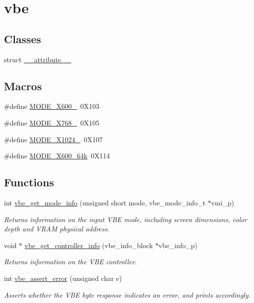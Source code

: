 \hypertarget{group__vbe}{}\section{vbe}
\label{group__vbe}
\subsection*{Classes}
\begin{DoxyCompactItemize}
\item 
struct \hyperlink{struct____attribute____}{\+\_\+\+\_\+attribute\+\_\+\+\_\+}
\end{DoxyCompactItemize}
\subsection*{Macros}
\begin{DoxyCompactItemize}
\item 
\#define \hyperlink{group__vbe_gaf81534a9db918a753a9896b07317b05a}{M\+O\+D\+E\+\_\+X600\+\_}~0\+X103
\item 
\#define \hyperlink{group__vbe_ga22528d5b4d6e5545c28def27f6074fe3}{M\+O\+D\+E\+\_\+X768\+\_}~0\+X105
\item 
\#define \hyperlink{group__vbe_gafe1e2b1f8808d2531aabf6b94b9947ca}{M\+O\+D\+E\+\_\+X1024\+\_}~0\+X107
\item 
\#define \hyperlink{group__vbe_gad5df9a29ede26cb662f094f3315de162}{M\+O\+D\+E\+\_\+X600\+\_\+64k}~0\+X114
\end{DoxyCompactItemize}
\subsection*{Functions}
\begin{DoxyCompactItemize}
\item 
int \hyperlink{group__vbe_ga4ef3234e41f2050bc094a22049b69e45}{vbe\+\_\+get\+\_\+mode\+\_\+info} (unsigned short mode, vbe\+\_\+mode\+\_\+info\+\_\+t $\ast$vmi\+\_\+p)
\begin{DoxyCompactList}\small\item\em Returns information on the input V\+BE mode, including screen dimensions, color depth and V\+R\+AM physical address. \end{DoxyCompactList}\item 
void $\ast$ \hyperlink{group__vbe_ga802bfdaa0b951c9fc68eff68d1b27436}{vbe\+\_\+get\+\_\+controller\+\_\+info} (vbe\+\_\+info\+\_\+block $\ast$vbe\+\_\+info\+\_\+p)
\begin{DoxyCompactList}\small\item\em Returns information on the V\+BE controller. \end{DoxyCompactList}\item 
int \hyperlink{group__vbe_ga71fc62857544124047314f3142672cfc}{vbe\+\_\+assert\+\_\+error} (unsigned char e)
\begin{DoxyCompactList}\small\item\em Asserts whether the V\+BE byte response indicates an error, and prints accordingly. \end{DoxyCompactList}\end{DoxyCompactItemize}
